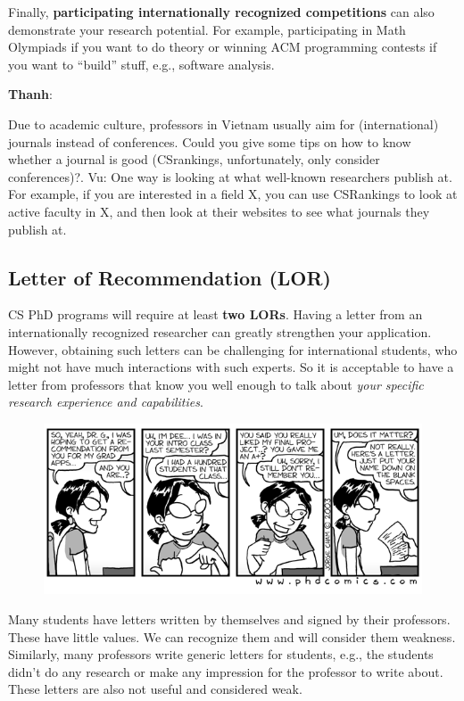 \documentclass[11pt]{article}
\newenvironment{commentbox}[1][]{
\small
    \begin{cbox}
    \textbf{#1}: 
 }{
   \end{cbox}
}
\begin{document}
Finally, \textbf{participating internationally recognized competitions} can also demonstrate your research potential.
For example, participating in Math Olympiads if you want to do theory or  winning ACM programming contests if you want to ``build'' stuff, e.g., software analysis.

\begin{commentbox}[Thanh]
Due to academic culture, professors in Vietnam usually aim for (international) journals instead of conferences. Could you give some tips on how to know whether a journal is good (CSrankings, unfortunately, only consider conferences)?.
\tcblower
Vu: One way is looking at what well-known researchers publish at. For example, if you are interested in a field X, you can use CSRankings to look at active faculty in X, and then look at their websites to see what journals they publish at.
\end{commentbox}

\subsection{Letter of Recommendation (LOR)}\label{sec:lor}




CS PhD programs will require at least \textbf{two LORs}. Having a letter from an internationally recognized researcher can greatly strengthen your application. However, obtaining such letters
can be challenging for international students, who might not have much interactions with such experts. So it is acceptable to have a letter from professors that know you well enough to talk about \emph{your specific research experience and capabilities}.

\begin{figure}
\vspace{-0.2in}
      \begin{center}
        \includegraphics[width=1\linewidth]{c6.png}
      \end{center}
      \vspace{-0.1in}
\end{figure}
Many students have letters written by themselves and signed by their professors. These have little
values. We can recognize them and will consider them weakness.
Similarly, many professors write generic letters for students, e.g., the students didn't do any
research or make any impression for the professor to write about. These letters are also not useful and considered weak.
\end{document}
